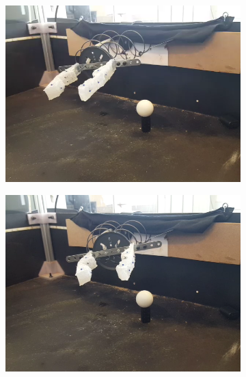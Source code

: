 \documentclass[letterpaper, 10 pt, conference]{ieeeconf}  %
\begin{document}
 \begin{figure}[htpb]
        \centering
        \begin{subfigure}[b]{0.72in} 
                \centering
                \includegraphics[width=\textwidth]{figures/path/g1.png}
        \end{subfigure}
        \begin{subfigure}[b]{0.72in}                            
                \centering
                \includegraphics[width=\textwidth]{figures/path/g2.png}
        \end{subfigure}
        \begin{subfigure}[b]{0.72in} 
                \centering

\end{subfigure}
\end{figure}
\end{document}
